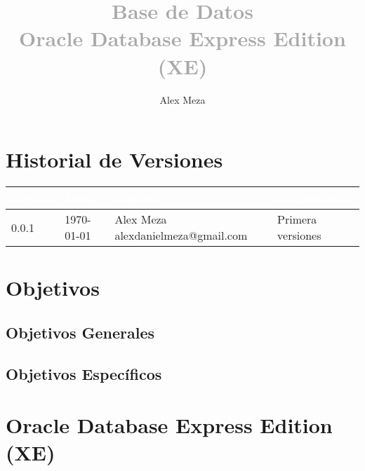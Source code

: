 \documentclass{article}
\title{
  \textbf{
    \Huge
    \textcolor{darkgray}{Base de Datos}
    \\ \vspace{1cm}
    \huge
    \textcolor{darkgray}{Oracle Database Express Edition (XE)}
  }
}
\author{Alex Meza}
\date{\dateEs}
\begin{document}
\maketitle

%
%
%
%
%
\newpage
\tableofcontents

%
%
%
%
%
\newpage
\section{Historial de Versiones}
\vspace{0.5cm}
\begin{tabular}{| p{2cm} | p{3.4cm} | p{4.8cm} | p{5.6cm} |}
  \hline
    \rowcolor{fuchsia700}
    \textcolor{White}{\textbf{Versión}} &
    \textcolor{White}{\textbf{Fecha}} &
    \textcolor{White}{\textbf{Elaboró}} &
    \textcolor{White}{\textbf{Comentarios}}
  \\
  \hline
    0.0.1 &
    \today &
    Alex Meza \newline alexdanielmeza@gmail.com &
    Primera versiones
  \\
  \hline
\end{tabular}

%
%
%
%
%
\newpage
\section{Objetivos}
\subsection{Objetivos Generales}
\subsection{Objetivos Específicos}

%
%
%
%
%
\section{Oracle Database Express Edition (XE)}
\end{document}
